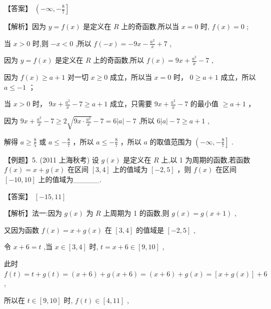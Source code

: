 \documentclass[10pt]{article}
\newcommand*\circled[1]{\tikz[baseline=(char.base)]{\node[shape=circle,draw,inner sep=1.5pt] (char) {\small #1};}}
\begin{document}
【答案】 \(\left( {-\infty , - \frac{8}{7}}\right\rbrack\)

【解析】因为 \(y = f\left( x\right)\) 是定义在 \(R\) 上的奇函数,所以当 \(x = 0\) 时, \(f\left( x\right)  = 0\) ;

当 \(x > 0\) 时,则 \(- x < 0\) ,所以 \(f\left( {-x}\right)  =  - {9x} - \frac{{a}^{2}}{x} + 7\) ,

因为 \(y = f\left( x\right)\) 是定义在 \(R\) 上的奇函数,所以 \(f\left( x\right)  = {9x} + \frac{{a}^{2}}{x} - 7\) ,

因为 \(f\left( x\right)  \geq  a + 1\) 对一切 \(x \geq  0\) 成立，所以当 \(x = 0\) 时， \(0 \geq  a + 1\) 成立，所以 \(a \leq   - 1\) ；

当 \(x > 0\) 时， \({9x} + \frac{{a}^{2}}{x} - 7 \geq  a + 1\) 成立，只需要 \({9x} + \frac{{a}^{2}}{x} - 7\) 的最小值 \(\geq  a + 1\) ，

因为 \({9x} + \frac{{a}^{2}}{x} - 7 \geq  2\sqrt{{9x} \cdot  \frac{{a}^{2}}{x}} - 7 = 6\left| a\right|  - 7\) ,所以 \(6\left| a\right|  - 7 \geq  a + 1\) ,

解得 \(a \geq  \frac{8}{5}\) 或 \(a \leq   - \frac{8}{7}\) ，所以 \(a \leq   - \frac{8}{7}\) ，所以 \(a\) 的取值范围为 \(\left( {-\infty , - \frac{8}{7}}\right\rbrack\) .

【例题】5. (2011 上海秋考) 设 \(g\left( x\right)\) 是定义在 \(R\) 上,以 1 为周期的函数,若函数 \(f\left( x\right)  = x + g\left( x\right)\) 在区间 \(\left\lbrack  {3,4}\right\rbrack\) 上的值域为 \(\left\lbrack  {-2,5}\right\rbrack\) ，则 \(f\left( x\right)\) 在区间 \(\left\lbrack  {-{10},{10}}\right\rbrack\) 上的值域为\_\_\_\_\_.

【答案】 \(\left\lbrack  {-{15},{11}}\right\rbrack\)

【解析】法一:因为 \(g\left( x\right)\) 为 \(R\) 上周期为 1 的函数,则 \(g\left( x\right)  = g\left( {x + 1}\right)\) ,

又因为函数 \(f\left( x\right)  = x + g\left( x\right)\) 在 \(\left\lbrack  {3,4}\right\rbrack\) 的值域是 \(\left\lbrack  {-2,5}\right\rbrack\) ,

令 \(x + 6 = t\) ,当 \(x \in  \left\lbrack  {3,4}\right\rbrack\) 时, \(t = x + 6 \in  \left\lbrack  {9,{10}}\right\rbrack\) ,

此时 \(f\left( t\right)  = t + g\left( t\right)  = \left( {x + 6}\right)  + g\left( {x + 6}\right)  = \left( {x + 6}\right)  + g\left( x\right)  = \left\lbrack  {x + g\left( x\right) }\right\rbrack   + 6\) ,

所以在 \(t \in  \left\lbrack  {9,{10}}\right\rbrack\) 时, \(f\left( t\right)  \in  \left\lbrack  {4,{11}}\right\rbrack\)  \circled{1} ,
\end{document}
